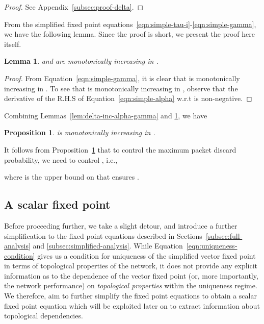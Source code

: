 \documentclass[12pt, draftclsnofoot, onecolumn]{IEEEtran}
\newtheorem{proposition}{Proposition}
\newtheorem{lemma}{Lemma}
\begin{document}
\begin{proof}
See Appendix~\ref{subsec:proof-delta}.
\end{proof}

From the simplified fixed point equations~\eqref{eqn:simple-tau-i}-\eqref{eqn:simple-gamma}, we have the following lemma. Since the proof is short, we present the proof here itself. 

\begin{lemma}
\label{lem:alpha-gamma-inc-tau}
 and  are monotonically increasing in .
\end{lemma}

\begin{proof}
From Equation~\eqref{eqn:simple-gamma}, it is clear that  is monotonically increasing in . To see that  is monotonically increasing in , observe that the derivative of the R.H.S of Equation~\eqref{eqn:simple-alpha} w.r.t  is non-negative. 
\end{proof}

Combining Lemmas~\ref{lem:delta-inc-alpha-gamma} and \ref{lem:alpha-gamma-inc-tau}, we have 

\begin{proposition}
\label{prop:delta-inc-tau}
 is monotonically increasing in .
\end{proposition}

It follows from Proposition~\ref{prop:delta-inc-tau} that to control the maximum packet discard probability, we need to control , i.e.,


where  is the upper bound on  that ensures .

\subsection{A scalar fixed point}
\label{subsec:scalar-fp}
Before proceeding further, we take a slight detour, and introduce a further simplification to the fixed point equations described in Sections~\ref{subsec:full-analysis} and \ref{subsec:simplified-analysis}. While Equation~\eqref{eqn:uniqueness-condition} gives us a condition for uniqueness of the simplified vector fixed point in terms of topological properties of the network, it does not provide any explicit information as to the dependence of the vector fixed point (or, more importantly, the network performance) on \emph{topological properties} within the uniqueness regime. We therefore, aim to further simplify the fixed point equations to obtain a scalar fixed point equation which will be exploited later on to extract information about topological dependencies. 
\end{document}
